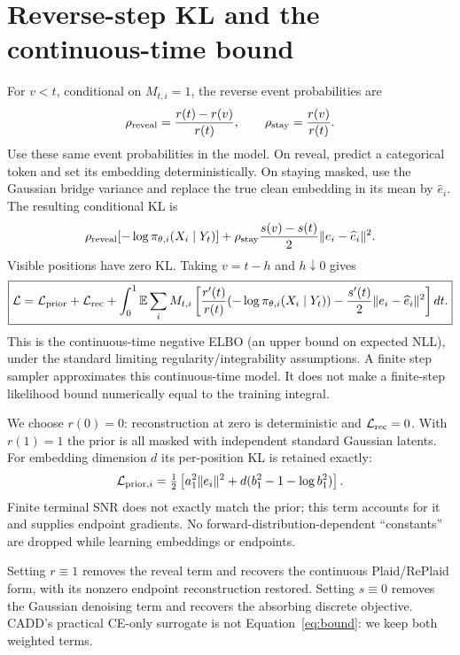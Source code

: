 \documentclass[11pt]{article}
\newcommand{\E}{\mathbb E}
\begin{document}
\section{Reverse-step KL and the continuous-time bound}
For $v<t$, conditional on $M_{t,i}=1$, the reverse event probabilities are
\[
 \rho_{\rm reveal}=\frac{r(t)-r(v)}{r(t)},\qquad
 \rho_{\rm stay}=\frac{r(v)}{r(t)}.
\]
Use these same event probabilities in the model. On reveal, predict a
categorical token and set its embedding deterministically. On staying
masked, use the Gaussian bridge variance and replace the true clean
embedding in its mean by $\widehat e_i$. The resulting conditional KL is
\[
 \rho_{\rm reveal}[-\log\pi_{\theta,i}(X_i\mid Y_t)]
 +\rho_{\rm stay}\frac{s(v)-s(t)}{2}\|e_i-\widehat e_i\|^2.
\]
Visible positions have zero KL. Taking $v=t-h$ and $h\downarrow0$ gives
\begin{equation}\label{eq:bound}
 \boxed{\mathcal L=\mathcal L_{\rm prior}+\mathcal L_{\rm rec}
 +\int_0^1\E\sum_i M_{t,i}\left[
 \frac{r'(t)}{r(t)}(-\log\pi_{\theta,i}(X_i\mid Y_t))
 -\frac{s'(t)}2\|e_i-\widehat e_i\|^2\right]dt.}
\end{equation}
This is the continuous-time negative ELBO (an upper bound on expected NLL),
under the standard limiting regularity/integrability assumptions. A finite
step sampler approximates this continuous-time model. It does not make a
finite-step likelihood bound numerically equal to the training integral.

We choose $r(0)=0$: reconstruction at zero is deterministic and
$\mathcal L_{\rm rec}=0$. With $r(1)=1$ the prior is all masked with
independent standard Gaussian latents. For embedding dimension $d$ its
per-position KL is retained exactly:
\[
 \mathcal L_{{\rm prior},i}=\tfrac12\left[
 a_1^2\|e_i\|^2+d(b_1^2-1-\log b_1^2)\right].
\]
Finite terminal SNR does not exactly match the prior; this term accounts
for it and supplies endpoint gradients. No forward-distribution-dependent
``constants'' are dropped while learning embeddings or endpoints.

Setting $r\equiv1$ removes the reveal term and recovers the continuous
Plaid/RePlaid form, with its nonzero endpoint reconstruction restored.
Setting $s\equiv0$ removes the Gaussian denoising term and recovers the
absorbing discrete objective. CADD's practical CE-only surrogate is not
Equation~\eqref{eq:bound}: we keep both weighted terms.
\end{document}
